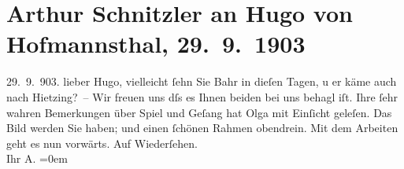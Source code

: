 

         
         \renewcommand{\erwaehntePersonen}{Personen: Hermann Bahr, Hugo von Hofmannsthal, Olga Schnitzler}
         \renewcommand{\erwaehnteOrte}{Orte: Wien, XIII., Hietzing}
         \renewcommand{\erwaehnteWerke}{Werke: Arthur Schnitzler (1903)}
               \section[Arthur Schnitzler an Hugo von Hofmannsthal, 29. 9. 1903]{ Arthur Schnitzler an Hugo von Hofmannsthal,
                    29. 9. 1903}\nopagebreak{}\rehead{ }\begin{ledgroupsized}[t]{13cm}\normalsize\beginnumbering \toendnotes[C]{\smallbreak\pagebreak[2]} 
\toendnotes[C]{\smallbreak}\pstart
           \raggedleft{}{\pb}29. 9. 903.\pend
           \pstart
           lieber Hugo, vielleicht ſehn Sie Bahr in dieſen Tagen, u er käme \label{K_L01320_1v}\label{K_L01320_1h} auch nach Hietzing? –\pend
           \pstart
           Wir freuen uns dſs es Ihnen beiden bei uns behagl iſt. Ihre ſehr wahren
                    Bemerkungen über Spiel und Geſang hat Olga
                    mit Einſicht geleſen.\pend
           \pstart
           Das Bild werden Sie haben;
                    und einen ſchönen Rahmen obendrein.\pend
           \pstart
           Mit dem Arbeiten geht es nun vorwärts.\pend
           \pstart
           Auf Wiederſehen.{\\[\baselineskip]}Ihr \spacefill\mbox{A.}\pend
           \leftskip=0em{}
         
         \endnumbering{}\end{ledgroupsized}  \newcommand{\dateiname}{L01320}\newcommand{\titel}{Arthur Schnitzler an Hugo von Hofmannsthal, 29. 9. 1903}\newcommand{\editorInnen}{ Martin Anton Müller und Gerd-Hermann Susen}
      